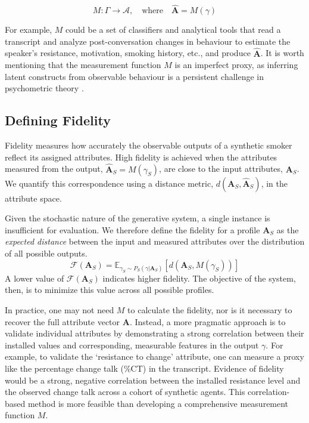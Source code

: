 $$M: \Gamma \rightarrow \mathcal{A}, \quad \text{where} \quad \hat{\textbf{A}} = M(\gamma)$$

For example, $M$ could be a set of classifiers and analytical tools that read a transcript and analyze post-conversation changes in behaviour to estimate the speaker's resistance, motivation, smoking history, etc., and produce  $\hat{\textbf{A}}$. It is worth mentioning that the measurement function $M$ is an imperfect proxy, as inferring latent constructs from observable behaviour is a persistent challenge in psychometric theory \cite{loevinger1957objective, borsboom2004concept}.

\subsection{Defining Fidelity}

Fidelity measures how accurately the observable outputs of a synthetic smoker reflect its assigned attributes. High fidelity is achieved when the attributes measured from the output, $\hat{\textbf{A}}_S = M(\gamma_S)$, are close to the input attributes, $\textbf{A}_S$. We quantify this correspondence using a distance metric, $d(\textbf{A}_S, \hat{\textbf{A}}_S)$, in the attribute space.

Given the stochastic nature of the generative system, a single instance is insufficient for evaluation. We therefore define the fidelity for a profile $\textbf{A}_S$ as the \emph{expected distance} between the input and measured attributes over the distribution of all possible outputs.
$$\mathcal{F}(\textbf{A}_S) = \mathbb{E}_{\gamma_S \sim P_S(\gamma | \textbf{A}_S)}[d(\textbf{A}_S, M(\gamma_S))]$$
A lower value of $\mathcal{F}(\textbf{A}_S)$ indicates higher fidelity. The objective of the system, then, is to minimize this value across all possible profiles.

In practice, one may not need $M$ to calculate the fidelity, nor is it necessary to recover the full attribute vector $\textbf{A}$. Instead, a more pragmatic approach is to validate individual attributes by demonstrating a strong correlation between their installed values and corresponding, measurable features in the output $\gamma$. For example, to validate the `resistance to change' attribute, one can measure a proxy like the percentage change talk (\%CT) in the transcript. Evidence of fidelity would be a strong, negative correlation between the installed resistance level and the observed change talk across a cohort of synthetic agents. This correlation-based method is more feasible than developing a comprehensive measurement function $M$.

